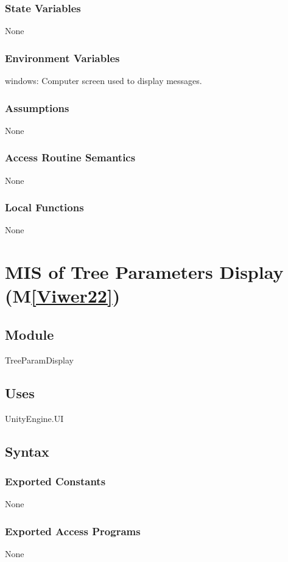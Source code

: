 \documentclass[12pt, titlepage]{article}
\newcommand{\mref}[1]{M\ref{#1}}
\begin{document}
\subsubsection{State Variables}
None
\subsubsection{Environment Variables}
windows: Computer screen used to display messages.

\subsubsection{Assumptions}

None

\subsubsection{Access Routine Semantics}
None

\subsubsection{Local Functions}
None

\newpage

\section{MIS of Tree Parameters Display (\mref{Viwer22})} 

\subsection{Module}
TreeParamDisplay

\subsection{Uses}
UnityEngine.UI 

\subsection{Syntax}

\subsubsection{Exported Constants}
None
\subsubsection{Exported Access Programs}
None
\end{document}
